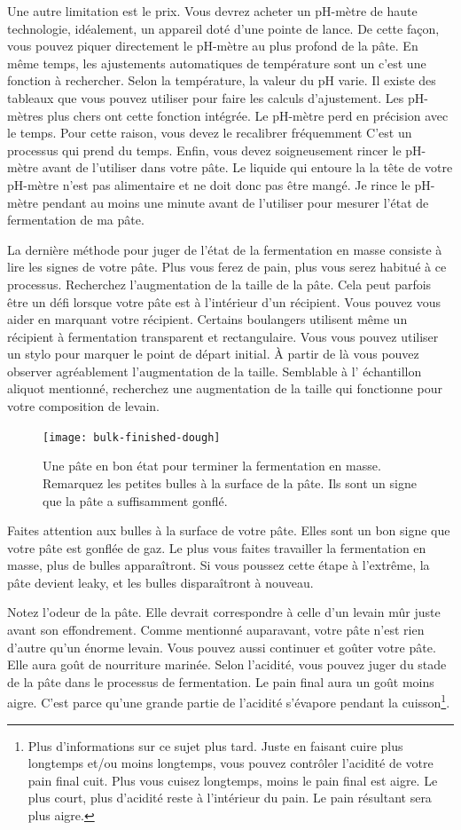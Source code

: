 Une autre limitation est le prix. Vous devrez acheter
un pH-mètre de haute technologie, idéalement, un appareil doté d'une pointe de lance.
De cette façon, vous pouvez piquer directement le pH-mètre au plus profond de la pâte.
En même temps, les ajustements automatiques de température sont un
c'est une fonction à rechercher. Selon la température,
la valeur du pH varie. Il existe des tableaux que vous pouvez utiliser pour
faire les calculs d'ajustement. Les pH-mètres plus chers
ont cette fonction intégrée. Le pH-mètre perd en précision
avec le temps. Pour cette raison, vous devez le recalibrer fréquemment
C'est un processus qui prend du temps.
Enfin, vous devez soigneusement rincer le pH-mètre avant
de l'utiliser dans votre pâte. Le liquide qui entoure la
la tête de votre pH-mètre n'est pas alimentaire et ne doit donc
pas être mangé. Je rince le pH-mètre pendant au moins une minute
avant de l'utiliser pour mesurer l'état de fermentation de ma pâte.

La dernière méthode pour juger de l'état de la fermentation en masse
consiste à lire les signes de votre pâte. Plus vous ferez de pain, plus vous serez habitué à ce processus.
Recherchez l'augmentation de la taille de la pâte. Cela peut parfois
être un défi lorsque votre pâte est à l'intérieur d'un récipient.
Vous pouvez vous aider en marquant votre récipient. Certains boulangers
utilisent même un récipient à fermentation transparent et rectangulaire. Vous
vous pouvez utiliser un stylo pour marquer le point de départ initial. À partir de là
vous pouvez observer agréablement l'augmentation de la taille. Semblable à l'
échantillon aliquot mentionné, recherchez une augmentation de la taille qui fonctionne
pour votre composition de levain.

\begin{figure}[!htb]
  \texttt{[image: bulk-finished-dough]}
  \caption[Pâte à la fin de la fermentation en masse]{Une pâte en bon état pour
      terminer la fermentation en masse. Remarquez les petites bulles à la surface de la pâte.
      Ils sont un signe que la pâte a suffisamment gonflé.}
\end{figure}Faites attention aux bulles à la surface de votre pâte. Elles
sont un bon signe que votre pâte est gonflée de gaz. Le
plus vous faites travailler la fermentation en masse, plus de bulles
apparaîtront. Si vous poussez cette étape à l'extrême, la pâte devient leaky, et
les bulles disparaîtront à nouveau.

Notez l'odeur de la pâte. Elle devrait correspondre à celle
d'un levain mûr juste avant son effondrement. Comme mentionné
auparavant, votre pâte n'est rien d'autre qu'un énorme levain. Vous
pouvez aussi continuer et goûter votre pâte. Elle aura goût de
nourriture marinée. Selon l'acidité, vous pouvez juger du stade
de la pâte dans le processus de fermentation. Le pain final
aura un goût moins aigre. C'est parce qu'une grande partie de l'acidité s'évapore
pendant la cuisson\footnote{Plus d'informations sur ce sujet plus tard.
Juste en faisant cuire plus longtemps et/ou moins longtemps, vous pouvez contrôler
l'acidité de votre pain final cuit. Plus vous cuisez longtemps, moins le pain final est aigre. Le plus court,
plus d'acidité reste à l'intérieur du pain. Le pain résultant
sera plus aigre.}.

